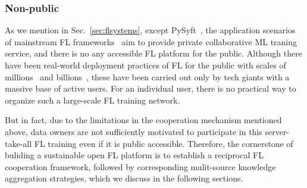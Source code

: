 \subsubsection{Non-public} %
As we mention in Sec.~\ref{sec:flsystems}, except PySyft~\cite{ziller2021pysyft}, the application scenarios of mainstream FL frameworks~\cite{liu2021fate, abadi2016tensorflow, zeng2021fedlab, caldas2018leaf, ibmfl2020ibm, he2020fedml, beutel2020flower, roth2022nvidia} aim to provide private collaborative ML traning service, and there is no any accessible FL platform for the public.
Although there have been real-world deployment practices of FL for the public with scales of millions~\cite{bonawitz2019towards} and billions~\cite{niu2020billion}, these have been carried out only by tech giants with a massive base of active users. For an individual user, there is no practical way to organize such a large-scale FL training network.

But in fact, due to the limitations in the cooperation mechanism mentioned above, data owners are not sufficiently motivated to participate in this server-take-all FL training even if it is public accessible. Therefore, the cornerstone of buliding a sustainable open FL platform is to establish a reciprocal FL cooperation framework, followed by corresponding mulit-source knowledge aggregation strategies, which we discuss in the following sections.
